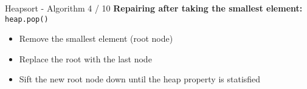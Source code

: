 
\begin{frame}{Heapsort - Algorithm 4 / 10}
  \textbf{Repairing after taking the smallest element:} \texttt{heap.pop()}
  \begin{itemize}
    \item<2- |handout:1>
      Remove the smallest element (root node)
    \item<3- |handout:1>
      Replace the root with the last node
    \item<4- |handout:1>
      {\color{MainA}Sift} the new root node down until the
      {\color{MainA}heap property} is statisfied
  \end{itemize}
\end{frame}


